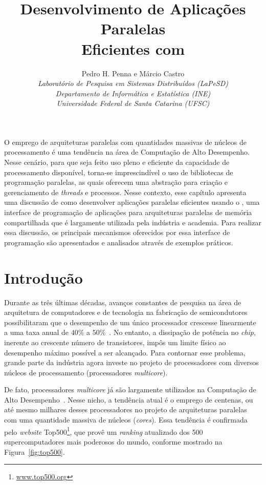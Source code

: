 \documentclass{SBCbookchapter}
\author{%
	Pedro H. Penna e Márcio Castro \\
	\textit{Laboratório de Pesquisa em Sistemas Distribuídos (LaPeSD)} \\
	\textit{Departamento de Informática e Estatística (INE)}           \\
	\textit{Universidade Federal de Santa Catarina (UFSC)}
}
\title{Desenvolvimento de Aplicações Paralelas\\Eficientes com \openmp}
\begin{document}
\maketitle

\begin{resumo}
	O emprego de arquiteturas paralelas com quantidades massivas de
	núcleos de processamento é uma tendência na área de Computação de
	Alto Desempenho. Nesse cenário, para que seja feito uso pleno e
	eficiente da capacidade de processamento disponível, torna-se
	imprescindível o uso de bibliotecas de programação paralelas, as
	quais oferecem uma abstração para criação e gerenciamento de
	\textit{threads} e processos. Nesse contexto, esse capítulo
	apresenta uma discussão de como desenvolver aplicações paralelas
	eficientes usando o \openmp, uma interface de programação de
	aplicações para arquiteturas paralelas de memória compartilhada que
	é largamente utilizada pela indústria e academia. Para realizar essa
	discussão, os principais mecanismos oferecidos por essa interface de
	programação são apresentados e analisados através de exemplos
	práticos.
\end{resumo}

\section{Introdução}

	Durante as três últimas décadas, avanços constantes de pesquisa na
	área de arquitetura de computadores e de tecnologia na fabricação de
	semicondutores possibilitaram que o desempenho de um único
	processador crescesse linearmente a uma taxa anual de $40\%$ a
	$50\%$~\cite{LARUS08}. No entanto, a dissipação de potência no
	\textit{chip}, inerente ao crescente número de transistores, impôs
	um limite físico ao desempenho máximo possível a ser alcançado.
	Para contornar esse problema, grande parte da indústria agora
	investe no projeto de processadores com diversos núcleos de
	processamento (processadores \textit{multicore}).

	De fato, processadores \textit{multicore} já são largamente
	utilizados na Computação de Alto Desempenho~\cite{Asanovic09}.
	Nesse nicho, a tendência atual é o emprego de centenas, ou até mesmo
	milhares desses processadores no projeto de arquiteturas paralelas
	com uma quantidade massiva de núcleos (\textit{cores}). Essa
	tendência é confirmada pelo \textit{website}
	Top500\footnote{\url{www.top500.org}}, que provê um
	\textit{ranking} atualizado	dos 500 supercomputadores mais poderosos
	do mundo, conforme mostrado na Figura~\ref{fig:top500}.
		
\end{document}
